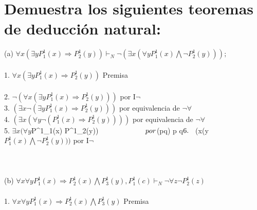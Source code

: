 \documentclass{article}
\begin{document}
\maketitle
\section{ Demuestra los siguientes teoremas de deducción natural:
}

(a) $\forall x(\exists yP^1_1(x) \Rightarrow P^1_2(y)) \vdash_N \neg(\exists x (\forall yP^1_1(x) \bigwedge \neg P^1_2(y)));$
\\
\\
1. \hspace{3mm}$\forall x(\exists yP^1_1(x) \Rightarrow P^1_2(y))$ \hspace{2.5cm} Premisa\\ \\
2. \hspace{3mm}$\neg (\forall x(\exists yP^1_1(x) \Rightarrow P^1_2(y)))$ \hspace{2cm} por  I$\neg$ \\
3. \hspace{3mm} $(\exists x\neg (\exists yP^1_1(x) \Rightarrow P^1_2(y)))$ \hspace{1.9cm} por equivalencia de $\neg\forall$ \\
4. \hspace{3mm} $(\exists x(\forall y \neg (P^1_1(x) \Rightarrow P^1_2(y))))$ \hspace{1.6cm} por equivalencia de $\neg\forall$ \\
5. \hspace{3mm} $\exists x(\forall y $P^1_1(x) \bigwedge \neg P^1_2(y))$  \hspace{2.3 cm} por $\neg (p\Rightarrow q) \equiv p \bigwedge \neg q$ \\
\\
6. \hspace{3mm} $\neg (\exists x(\forall y $P^1_1(x) \bigwedge \neg P^1_2(y)))$  \hspace{1.8 cm} por I$\neg$ \\
\\
\\
\\
(b) $\forall x\forall yP^1_1(x) \Rightarrow P^1_2(x)\bigwedge P^1_3(y),P^1_1(c)  \vdash_N \neg \forall z \neg P^1_2(z)$
\\
\\
1. \hspace{3mm} $\forall x\forall yP^1_1(x) \Rightarrow P^1_2(x)\bigwedge P^1_3(y)$ \hspace{1.5cm} Premisa\\
\end{document}
